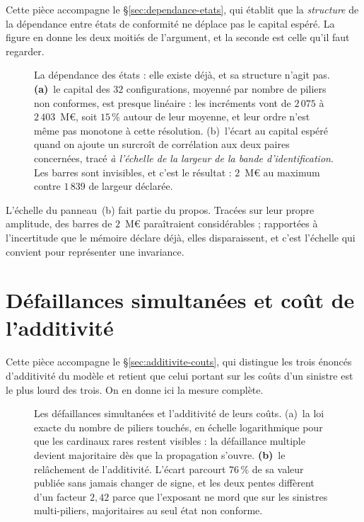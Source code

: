 
Cette pièce accompagne le \S\ref{sec:dependance-etats}, qui établit que la \emph{structure} de la
dépendance entre états de conformité ne déplace pas le capital espéré. La figure en donne les
deux moitiés de l'argument, et la seconde est celle qu'il faut regarder.

\begin{figure}[htbp]\centering
{}
\caption{La dépendance des états : elle existe déjà, et sa structure n'agit pas.
\textbf{(a)}~le capital des $32$ configurations, moyenné par nombre de piliers non conformes,
est presque linéaire : les incréments vont de $2\,075$ à $2\,403$~M\euro, soit $15\,\%$ autour de
leur moyenne, et leur ordre n'est même pas monotone à cette résolution. (b)~l'écart au
capital espéré quand on ajoute un surcroît de corrélation aux deux paires concernées, tracé
\emph{à l'échelle de la largeur de la bande d'identification}. Les barres sont invisibles, et
c'est le résultat : $2$~M\euro{} au maximum contre $1\,839$ de largeur déclarée.}
\label{fig:dependance-etats}
\end{figure}

\noindent L'échelle du panneau~(b) fait partie du propos. Tracées sur leur propre amplitude, des
barres de $2$~M\euro{} paraîtraient considérables ; rapportées à l'incertitude que le mémoire
déclare déjà, elles disparaissent, et c'est l'échelle qui convient pour représenter une
invariance.

\section{Défaillances simultanées et coût de l'additivité}
\label{sec:ann-additivite}


Cette pièce accompagne le \S\ref{sec:additivite-couts}, qui distingue les trois énoncés
d'additivité du modèle et retient que celui portant sur les coûts d'un sinistre est le plus lourd
des trois. On en donne ici la mesure complète.

\begin{figure}[!tb]\centering
{}
\caption{Les défaillances simultanées et l'additivité de leurs coûts. (a)~la loi exacte
du nombre de piliers touchés, en échelle logarithmique pour que les cardinaux rares restent
visibles : la défaillance multiple devient majoritaire dès que la propagation s'ouvre.
\textbf{(b)}~le relâchement de l'additivité. L'écart parcourt $76\,\%$ de sa valeur publiée sans
jamais changer de signe, et les deux pentes diffèrent d'un facteur $2{,}42$ parce que l'exposant ne
mord que sur les sinistres multi-piliers, majoritaires au seul état non conforme.}
\label{fig:additivite-couts}
\end{figure}

